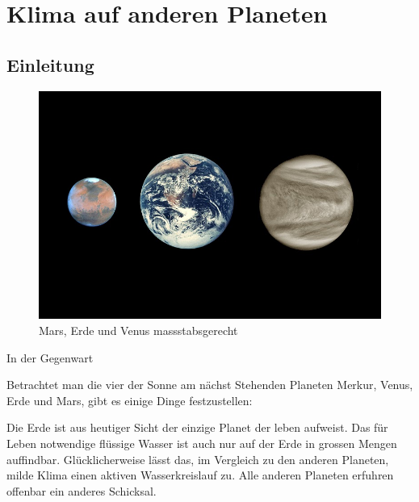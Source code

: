 %
%
%

\chapter{Klima auf anderen Planeten\label{chapter:thema}}
\begin{refsection}

\section{Einleitung}
\begin{figure}
	\centering
	\includegraphics[width=0.7\linewidth, trim={0 3cm 0 3cm},clip]{planeten/Pictures/planets.jpg}
	\caption{Mars, Erde und Venus massstabsgerecht}
\end{figure}




In der Gegenwart

Betrachtet man die vier der Sonne am nächst Stehenden Planeten Merkur, Venus, Erde und Mars, gibt es einige Dinge festzustellen:

Die Erde ist aus heutiger Sicht der einzige Planet der leben aufweist. Das für Leben notwendige flüssige Wasser ist auch nur auf der Erde in grossen Mengen auffindbar. Glücklicherweise lässt das, im Vergleich zu den anderen Planeten, milde Klima einen aktiven Wasserkreislauf zu.
Alle anderen Planeten erfuhren offenbar ein anderes Schicksal.


\end{refsection}
